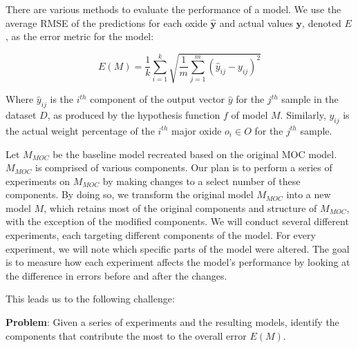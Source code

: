 There are various methods to evaluate the performance of a model.
We use the average RMSE of the predictions for each oxide $\mathbf{\hat{y}}$ and actual values $\mathbf{y}$, denoted $E$, as the error metric for the model:

\begin{equation}\label{eq:avg_rmse_metric}
    E(M) = \frac{1}{k} \sum_{i=1}^{k} \sqrt{\frac{1}{m} \sum_{j=1}^{m} (\hat{y}_{ij} - y_{ij})^2}
\end{equation}

Where \( \hat{y}_{ij} \) is the \( i^{th} \) component of the output vector \( \hat{y} \) for the \( j^{th} \) sample in the dataset \( D \), as produced by the hypothesis function \( f \) of model \( M \). Similarly, \( y_{ij} \) is the actual weight percentage of the \( i^{th} \) major oxide \( o_i \in O \) for the \( j^{th} \) sample.

Let $M_{MOC}$ be the baseline model recreated based on the original MOC model. $M_{MOC}$ is comprised of various components.
Our plan is to perform a series of experiments on $M_{MOC}$ by making changes to a select number of these components.
By doing so, we transform the original model $M_{MOC}$ into a new model $M$, which retains most of the original components and structure of $M_{MOC}$, with the exception of the modified components.
We will conduct several different experiments, each targeting different components of the model.
For every experiment, we will note which specific parts of the model were altered.
The goal is to measure how each experiment affects the model's performance by looking at the difference in errors before and after the changes.

This leads us to the following challenge:

\textbf{Problem}: Given a series of experiments and the resulting models, identify the components that contribute the most to the overall error $E(M)$. 